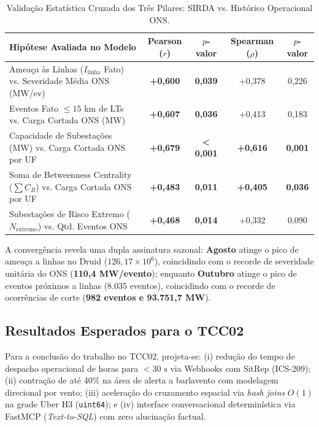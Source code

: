 \begin{table}[htbp]
\centering
\scriptsize
\caption{Validação Estatística Cruzada dos Três Pilares: SIRDA vs. Histórico Operacional ONS.}
\label{tab:validacao_triangulada_tcc}
\begin{tabular}{lcccc}
\toprule
\textbf{Hipótese Avaliada no Modelo} & \textbf{Pearson ($r$)} & \textbf{$p$-valor} & \textbf{Spearman ($\rho$)} & \textbf{$p$-valor} \\
\midrule
Ameaça às Linhas ($I_{\text{linha}}$ Fato) vs. Severidade Média ONS (MW/ev) & \textbf{+0,600} & \textbf{0,039} & +0,378 & 0,226 \\
Eventos Fato $\le 15$ km de LTs vs. Carga Cortada ONS (MW)                  & \textbf{+0,607} & \textbf{0,036} & +0,413 & 0,183 \\
Capacidade de Subestações (MW) vs. Carga Cortada ONS por UF                 & \textbf{+0,679} & \textbf{< 0,001} & \textbf{+0,616} & \textbf{0,001} \\
Soma de Betweenness Centrality ($\sum C_B$) vs. Carga Cortada ONS por UF   & \textbf{+0,483} & \textbf{0,011} & \textbf{+0,405} & \textbf{0,036} \\
Subestações de Risco Extremo ($N_{\text{extremo}}$) vs. Qtd. Eventos ONS    & \textbf{+0,468} & \textbf{0,014} & +0,332 & 0,090 \\
\bottomrule
\end{tabular}
\end{table}

A convergência revela uma dupla assinatura sazonal: \textbf{Agosto} atinge o pico de ameaça a linhas no Druid ($126{,}17 \times 10^6$), coincidindo com o recorde de severidade unitária do ONS (\textbf{110,4 MW/evento}); enquanto \textbf{Outubro} atinge o pico de eventos próximos a linhas (8.035 eventos), coincidindo com o recorde de ocorrências de corte (\textbf{982 eventos e 93.751,7 MW}).

\subsection{Resultados Esperados para o TCC02}
Para a conclusão do trabalho no TCC02, projeta-se: (i) redução do tempo de despacho operacional de horas para $< 30\text{ s}$ via Webhooks com SitRep (ICS-209); (ii) contração de até 40\% na área de alerta a barlavento com modelagem direcional por vento; (iii) aceleração do cruzamento espacial via \textit{hash joins} $O(1)$ na grade Uber H3 (\texttt{uint64}); e (iv) interface conversacional determinística via FastMCP (\textit{Text-to-SQL}) com zero alucinação factual.
